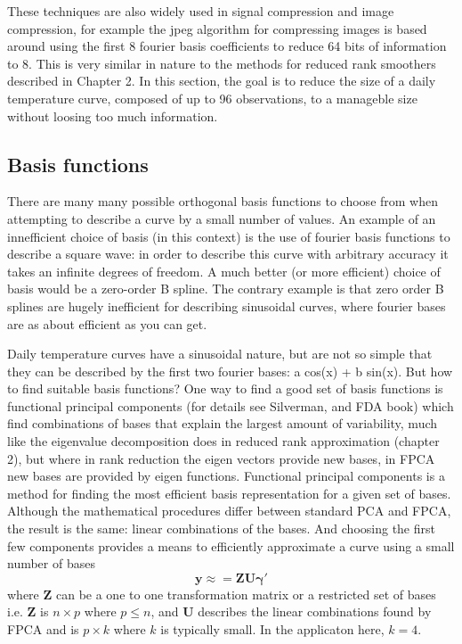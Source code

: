 These techniques are also widely used in signal compression and image compression, for example the jpeg algorithm for compressing images is based around using the first 8 fourier basis coefficients to reduce 64 bits of information to 8.  This is very similar in nature to the methods for reduced rank smoothers described in Chapter 2.  In this section, the goal is to reduce the size of a daily temperature curve, composed of up to 96 observations, to a manageble size without loosing too much information.





\subsection{Basis functions}

There are many many possible orthogonal basis functions to choose from when attempting to describe a curve by a small number of values.  An example of an innefficient choice of basis (in this context) is the use of fourier basis functions to describe a square wave: in order to describe this curve with arbitrary accuracy it takes an infinite degrees of freedom.  A much better (or more efficient) choice of basis would be a zero-order B spline.  The contrary example is that zero order B splines are hugely inefficient for describing sinusoidal curves, where fourier bases are as about efficient as you can get.

Daily temperature curves have a sinusoidal nature, but are not so simple that they can be described by the first two fourier bases: a cos(x) + b sin(x). But how to find suitable basis functions?  One way to find a good set of basis functions is functional principal components (for details see Silverman, and FDA book) which find  combinations of bases that explain the largest amount of variability, much like the eigenvalue decomposition does in reduced rank approximation (chapter 2), but where in rank reduction the eigen vectors provide new bases, in FPCA new bases are provided by eigen functions. Functional principal components is a method for finding the most efficient basis representation for a given set of bases.  Although the mathematical procedures differ between standard PCA and FPCA, the result is the same: linear combinations of the bases.  And choosing the first few components provides a means to efficiently approximate a curve using a small number of bases
\begin{equation}
   \bm{y} \approx = \bm{Z}\bm{U}\bm{\gamma}'
\end{equation}
where $\bm{Z}$ can be a one to one transformation matrix or a restricted set of bases i.e. $\bm{Z}$ is $n \times p$ where $p \leq n$, and $\bm{U}$ describes the linear combinations found by FPCA and is $p \times k$ where $k$ is typically small.  In the applicaton here, $k=4$.

